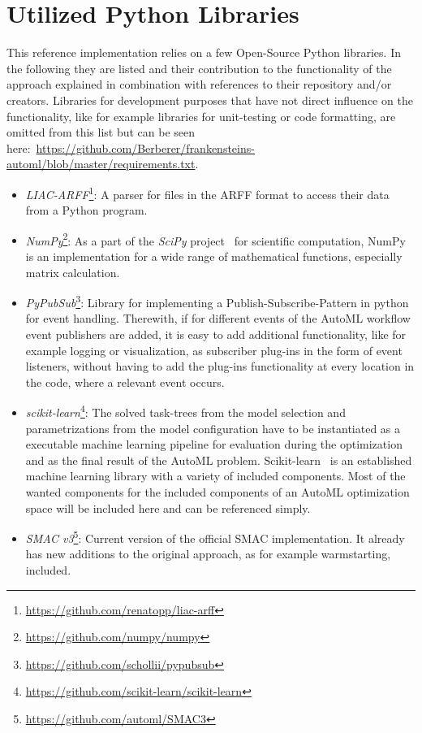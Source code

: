 \section{Utilized Python Libraries}
\label{sec:implementation:libraries}
This reference implementation relies on a few Open-Source Python libraries.
In the following they are listed and their contribution to the functionality of the approach explained in combination with references to their repository and/or creators.
Libraries for development purposes that have not direct influence on the functionality, like for example libraries for unit-testing or code formatting, are omitted from this list but can be seen here:~\url{https://github.com/Berberer/frankensteins-automl/blob/master/requirements.txt}. 
\begin{itemize}
    \item \textit{LIAC-ARFF}\footnote{\url{https://github.com/renatopp/liac-arff}}: A parser for files in the ARFF format to access their data from a Python program.
    \item \textit{NumPy}\footnote{\url{https://github.com/numpy/numpy}}: As a part of the \textit{SciPy} project~\cite{Virtanen-SciPy} for scientific computation, NumPy is an implementation for a wide range of mathematical functions, especially matrix calculation.
    \item \textit{PyPubSub}\footnote{\url{https://github.com/schollii/pypubsub}}: Library for implementing a Publish-Subscribe-Pattern in python for event handling.
    Therewith, if for different events of the AutoML workflow event publishers are added, it is easy to add additional functionality, like for example logging or visualization, as subscriber plug-ins in the form of event listeners, without having to add the plug-ins functionality at every location in the code, where a relevant event occurs.
    \item \textit{scikit-learn}\footnote{\url{https://github.com/scikit-learn/scikit-learn}}: The solved task-trees from the model selection and parametrizations from the model configuration have to be instantiated as a executable machine learning pipeline for evaluation during the optimization and as the final result of the AutoML problem.
    Scikit-learn~\cite{Pedregosa-Scikit-learn} is an established machine learning library with a variety of included components.
    Most of the wanted components for the included components of an AutoML optimization space will be included here and can be referenced simply.
    \item \textit{SMAC v3}\footnote{\url{https://github.com/automl/SMAC3}}: Current version of the official SMAC implementation. It already has new additions to the original approach, as for example warmstarting, included.

\end{itemize}
